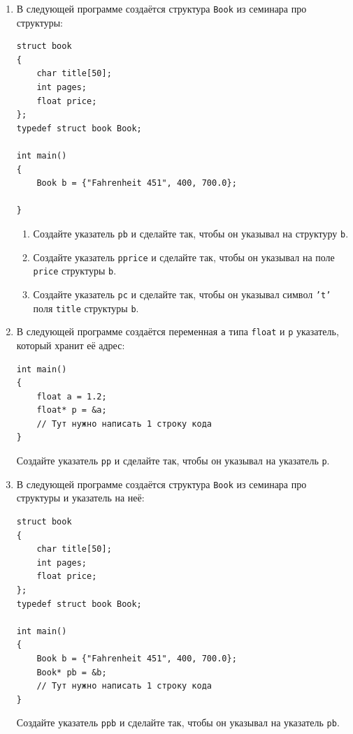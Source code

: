 \documentclass{article}
\begin{document}
\begin{enumerate}
\item В следующей программе создаётся структура \texttt{Book} из семинара про структуры:
\begin{lstlisting}
struct book 
{
    char title[50];
    int pages;
    float price;
};
typedef struct book Book;

int main() 
{
    Book b = {"Fahrenheit 451", 400, 700.0};

}
\end{lstlisting}

\begin{enumerate}
\item Создайте указатель \texttt{pb} и сделайте так, чтобы он указывал на структуру \texttt{b}.
\item Создайте указатель \texttt{pprice} и сделайте так, чтобы он указывал на поле \texttt{price} структуры \texttt{b}.
\item Создайте указатель \texttt{pc} и сделайте так, чтобы он указывал символ \texttt{'t'} поля \texttt{title} структуры \texttt{b}.
\end{enumerate} 


\item В следующей программе создаётся переменная \texttt{a} типа \texttt{float} и \texttt{p} указатель, который хранит её адрес:
\begin{lstlisting}
int main() 
{
    float a = 1.2;
    float* p = &a;
    // Тут нужно написать 1 строку кода
}
\end{lstlisting}
Создайте указатель \texttt{pp} и сделайте так, чтобы он указывал на указатель \texttt{p}.


\item В следующей программе создаётся структура \texttt{Book} из семинара про структуры и указатель на неё:
\begin{lstlisting}
struct book 
{
    char title[50];
    int pages;
    float price;
};
typedef struct book Book;

int main() 
{
    Book b = {"Fahrenheit 451", 400, 700.0};
    Book* pb = &b;
    // Тут нужно написать 1 строку кода
}
\end{lstlisting}
Создайте указатель \texttt{ppb} и сделайте так, чтобы он указывал на указатель \texttt{pb}.


\end{enumerate}
\end{document}
